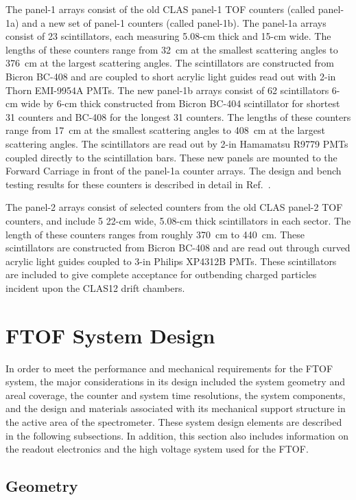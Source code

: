 \documentclass[final,3p,twocolumn]{elsarticle}
\begin{document}
The panel-1 arrays consist of the old CLAS panel-1 TOF counters (called panel-1a) and a new set of panel-1
counters (called panel-1b).  The panel-1a arrays consist of 23 scintillators, each measuring 5.08-cm thick
and 15-cm wide.  The lengths of these counters range from 32~cm at the smallest scattering angles to
376~cm at the largest scattering angles.  The scintillators are constructed from Bicron BC-408 and are
coupled to short acrylic light guides read out with 2-in Thorn EMI-9954A PMTs.  The new panel-1b arrays
consist of 62 scintillators 6-cm wide by 6-cm thick constructed from Bicron BC-404 scintillator for shortest
31 counters and BC-408 for the longest 31 counters. The lengths of these counters range from 17~cm at the
smallest scattering angles to 408~cm at the largest scattering angles. The scintillators are read out by 2-in
Hamamatsu R9779 PMTs coupled directly to the scintillation bars. These new panels are mounted to the
Forward Carriage in front of the panel-1a counter arrays. The design and bench testing results for these
counters is described in detail in Ref.~\cite{nim-p1b}.

The panel-2 arrays consist of selected counters from the old CLAS panel-2 TOF counters, and include 5
22-cm wide, 5.08-cm thick scintillators in each sector.  The length of these counters ranges from roughly
370~cm to 440~cm.  These scintillators are constructed from Bicron BC-408 and are read out through
curved acrylic light guides coupled to 3-in Philips XP4312B PMTs. These scintillators are included to give
complete acceptance for outbending charged particles incident upon the CLAS12 drift chambers.  

\section{FTOF System Design}
\label{sec:design}

In order to meet the performance and mechanical requirements for the FTOF system, the major
considerations in its design included the system geometry and areal coverage, the counter and system
time resolutions, the system components, and the design and materials associated with its mechanical
support structure in the active area of the spectrometer. These system design elements are described
in the following subsections. In addition, this section also includes information on the readout electronics
and the high voltage system used for the FTOF.

\subsection{Geometry}
\label{ftof-geometry}
\end{document}
